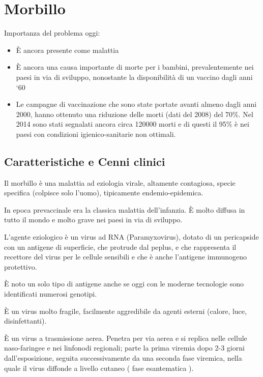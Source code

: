 \section{Morbillo}

Importanza del problema oggi:

\begin{itemize}
\item
  È ancora presente come malattia
\item
  È ancora una causa importante di morte per i bambini, prevalentemente
  nei paesi in via di sviluppo, nonostante la disponibilità di un
  vaccino dagli anni `60
\item
  Le campagne di vaccinazione che sono state portate avanti almeno dagli
  anni 2000, hanno ottenuto una riduzione delle morti (dati del 2008)
  del 70\%. Nel 2014 sono stati segnalati ancora circa 120000 morti e di
  questi il 95\% è nei paesi con condizioni igienico-sanitarie non
  ottimali.
\end{itemize}

\subsection{Caratteristiche e Cenni clinici}

Il morbillo è una malattia ad eziologia virale, altamente contagiosa,
specie specifica (colpisce solo l'uomo), tipicamente endemio-epidemica.

In epoca prevaccinale era la classica malattia dell'infanzia. È molto
diffusa in tutto il mondo e molto grave nei paesi in via di sviluppo.

L'agente eziologico è un virus ad RNA (Paramyxovirus), dotato di un
pericapside con un antigene di superficie, che protrude dal peplus, e
che rappresenta il recettore del virus per le cellule sensibili e che è
anche l'antigene immunogeno protettivo.

È noto un solo tipo di antigene anche se oggi con le moderne tecnologie
sono identificati numerosi genotipi.

È un virus molto fragile, facilmente aggredibile da agenti esterni
(calore, luce, disinfettanti).

È un virus a trasmissione aerea. Penetra per via aerea e si replica
nelle cellule naso-faringee e nei linfonodi regionali; parte la prima
viremia dopo 2-3 giorni dall'esposizione, seguita successivamente da una
seconda fase viremica, nella quale il virus diffonde a livello cutaneo (
fase esantematica ).



